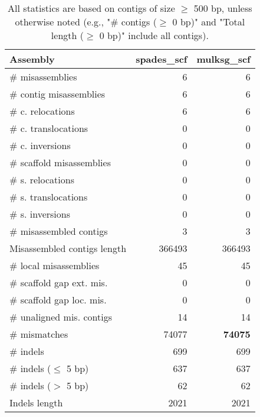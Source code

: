 \documentclass[12pt,a4paper]{article}
\begin{document}
\begin{table}[ht]
\begin{center}
\caption{All statistics are based on contigs of size $\geq$ 500 bp, unless otherwise noted (e.g., "\# contigs ($\geq$ 0 bp)" and "Total length ($\geq$ 0 bp)" include all contigs).}
\begin{tabular}{|l*{2}{|r}|}
\hline
Assembly & spades\_scf & mulksg\_scf \\ \hline
\# misassemblies & 6 & 6 \\ \hline
\hspace{2mm}\# contig misassemblies & 6 & 6 \\ \hline
\hspace{5mm}\# c. relocations & 6 & 6 \\ \hline
\hspace{5mm}\# c. translocations & 0 & 0 \\ \hline
\hspace{5mm}\# c. inversions & 0 & 0 \\ \hline
\hspace{2mm}\# scaffold misassemblies & 0 & 0 \\ \hline
\hspace{5mm}\# s. relocations & 0 & 0 \\ \hline
\hspace{5mm}\# s. translocations & 0 & 0 \\ \hline
\hspace{5mm}\# s. inversions & 0 & 0 \\ \hline
\# misassembled contigs & 3 & 3 \\ \hline
Misassembled contigs length & 366493 & 366493 \\ \hline
\# local misassemblies & 45 & 45 \\ \hline
\# scaffold gap ext. mis. & 0 & 0 \\ \hline
\# scaffold gap loc. mis. & 0 & 0 \\ \hline
\# unaligned mis. contigs & 14 & 14 \\ \hline
\# mismatches & 74077 & {\bf 74075} \\ \hline
\# indels & 699 & 699 \\ \hline
\hspace{5mm}\# indels ($\leq$ 5 bp) & 637 & 637 \\ \hline
\hspace{5mm}\# indels ($>$ 5 bp) & 62 & 62 \\ \hline
Indels length & 2021 & 2021 \\ \hline
\end{tabular}
\end{center}
\end{table}
\end{document}
